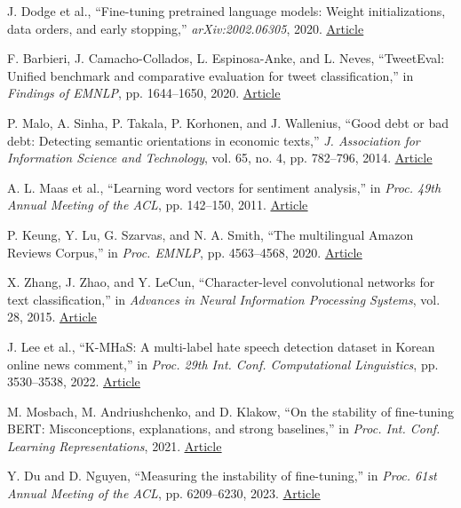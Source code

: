 \documentclass{SPC}
\begin{document}
\begin{reference}
 J. Dodge et al., ``Fine-tuning pretrained language models: Weight initializations, data orders, and early stopping,'' \textit{arXiv:2002.06305}, 2020. \href{https://doi.org/10.48550/arXiv.2002.06305}{\underline{Article}}

 F. Barbieri, J. Camacho-Collados, L. Espinosa-Anke, and L. Neves, ``TweetEval: Unified benchmark and comparative evaluation for tweet classification,'' in \textit{Findings of EMNLP}, pp. 1644--1650, 2020. \href{https://doi.org/10.18653/v1/2020.findings-emnlp.148}{\underline{Article}}

 P. Malo, A. Sinha, P. Takala, P. Korhonen, and J. Wallenius, ``Good debt or bad debt: Detecting semantic orientations in economic texts,'' \textit{J. Association for Information Science and Technology}, vol. 65, no. 4, pp. 782--796, 2014. \href{https://doi.org/10.1002/asi.23062}{\underline{Article}}

 A. L. Maas et al., ``Learning word vectors for sentiment analysis,'' in \textit{Proc. 49th Annual Meeting of the ACL}, pp. 142--150, 2011. \href{https://aclanthology.org/P11-1015/}{\underline{Article}}

 P. Keung, Y. Lu, G. Szarvas, and N. A. Smith, ``The multilingual Amazon Reviews Corpus,'' in \textit{Proc. EMNLP}, pp. 4563--4568, 2020. \href{https://doi.org/10.18653/v1/2020.emnlp-main.369}{\underline{Article}}

 X. Zhang, J. Zhao, and Y. LeCun, ``Character-level convolutional networks for text classification,'' in \textit{Advances in Neural Information Processing Systems}, vol. 28, 2015. \href{https://arxiv.org/abs/1509.01626}{\underline{Article}}

 J. Lee et al., ``K-MHaS: A multi-label hate speech detection dataset in Korean online news comment,'' in \textit{Proc. 29th Int. Conf. Computational Linguistics}, pp. 3530--3538, 2022. \href{https://aclanthology.org/2022.coling-1.311/}{\underline{Article}}

 M. Mosbach, M. Andriushchenko, and D. Klakow, ``On the stability of fine-tuning BERT: Misconceptions, explanations, and strong baselines,'' in \textit{Proc. Int. Conf. Learning Representations}, 2021. \href{https://openreview.net/forum?id=nzpLWnVAyah}{\underline{Article}}

 Y. Du and D. Nguyen, ``Measuring the instability of fine-tuning,'' in \textit{Proc. 61st Annual Meeting of the ACL}, pp. 6209--6230, 2023. \href{https://doi.org/10.18653/v1/2023.acl-long.342}{\underline{Article}}


\end{reference}
\end{document}
